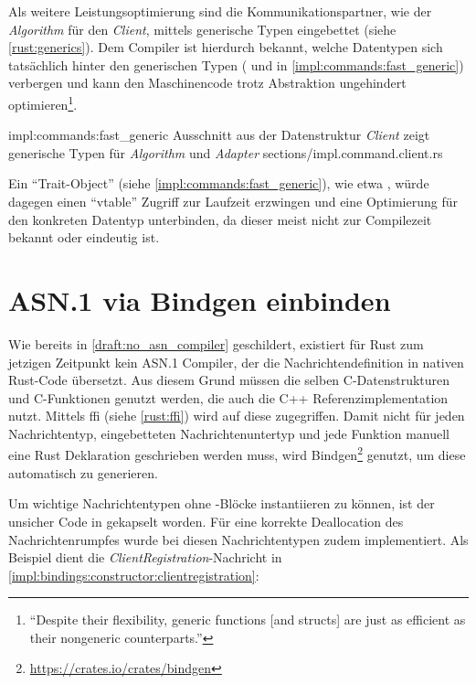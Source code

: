 Als weitere Leistungsoptimierung sind die Kommunikationspartner, wie der \textit{Algorithm} für den \textit{Client}, mittels generische Typen eingebettet (siehe \autoref{rust:generics}).
Dem Compiler ist hierdurch bekannt, welche Datentypen sich tatsächlich hinter den generischen Typen ( und  in \autoref{impl:commands:fast_generic}) verbergen und kann den Maschinencode trotz Abstraktion ungehindert optimieren\footnote{\enquote{Despite their flexibility, generic functions [and structs] are just as efficient as their nongeneric counterparts.}\cite[45]{rust:orly_programming}}.

\rustcinclude
	{impl:commands:fast_generic}
	{Ausschnitt aus der Datenstruktur \textit{Client} zeigt generische Typen für \textit{Algorithm} und \textit{Adapter}}
	{sections/impl.command.client.rs}
	
Ein \enquote{Trait-Object} (siehe \autoref{impl:commands:fast_generic}), wie etwa , würde dagegen einen \enquote{vtable} Zugriff zur Laufzeit erzwingen und eine Optimierung für den konkreten Datentyp unterbinden, da dieser meist nicht zur Compilezeit bekannt oder eindeutig ist.

\clearpage
\section{ASN.1 via Bindgen einbinden}
\label{impl:asn1_bindings}
\label{impl:issue:ffi}


Wie bereits in \autoref{draft:no_asn_compiler} geschildert, existiert für Rust zum jetzigen Zeitpunkt kein ASN.1 Compiler, der die Nachrichtendefinition in nativen Rust-Code übersetzt.
Aus diesem Grund müssen die selben C-Datenstrukturen und C-Funktionen genutzt werden, die auch die C++ Referenzimplementation nutzt.
Mittels \gls{ffi} (siehe \autoref{rust:ffi}) wird auf diese zugegriffen.
Damit nicht für jeden Nachrichtentyp, eingebetteten Nachrichtenuntertyp und jede Funktion manuell eine Rust Deklaration geschrieben werden muss, wird Bindgen\footnote{\url{https://crates.io/crates/bindgen}} genutzt, um diese automatisch zu generieren.

Um wichtige Nachrichtentypen ohne -Blöcke instantiieren zu können, ist der unsicher Code in  gekapselt worden.
Für eine korrekte Deallocation des Nachrichtenrumpfes wurde bei diesen Nachrichtentypen zudem  %
implementiert.
Als Beispiel dient die \textit{ClientRegistration}-Nachricht in \autoref{impl:bindings:constructor:clientregistration}:


